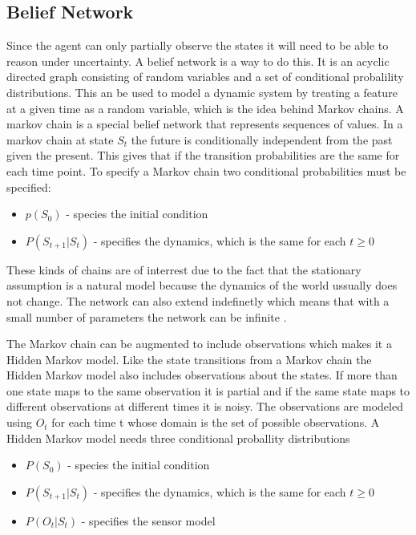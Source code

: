 \subsection{Belief Network}
Since the agent can only partially observe the states it will need to be able to
reason under uncertainty. A belief network is a way to do this. It is an acyclic
directed graph consisting of random variables and a set of conditional
probalility distributions. This an be used to model a dynamic system by
treating a feature at a given time as a random variable, which is the idea
behind Markov chains. A markov chain is a special belief network that
represents sequences of values. In a markov chain at state $S_t$ the future is
conditionally independent from the past given the present. This gives that if
the transition probabilities are the same for each time point. To specify a
Markov chain two conditional probabilities must be specified:
\begin{itemize}
  \item $p(S_0)$ - species the initial condition
  \item $P(S_{t+1}|S_t)$ - specifies the dynamics, which is the same for each $t
  \geq 0$
\end{itemize}

These kinds of chains are of interrest due to the fact that the stationary
assumption is a natural model because the dynamics of the world ussually does
not change. The network can also extend indefinetly which means that with a
small number of parameters the network can be infinite \citep[Ch.
6.5.1]{MIBook}.\nl

The Markov chain can be augmented to include observations which makes it a
Hidden Markov model. Like the state transitions from a Markov chain the Hidden
Markov model also includes observations about the states. If more than one state
maps to the same observation it is partial and if the same state maps to
different observations at different times it is noisy. The observations are
modeled using $O_t$ for each time t whose domain is the set of possible
observations. A Hidden Markov model needs three conditional proballity
distributions \citep[6.5.2]{MIBook}
\begin{itemize}
  \item $P(S_0)$ - species the initial condition
  \item $P(S_{t+1}|S_t)$ - specifies the dynamics, which is the same for each $t
  \geq 0$
  \item $P(O_t|S_t)$ - specifies the sensor model
\end{itemize}

